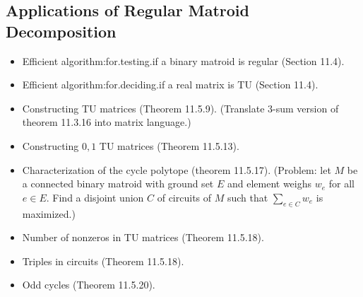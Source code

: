 \subsection{Applications of Regular Matroid Decomposition}

\begin{itemize}
  \item Efficient algorithm:for.testing.if a binary matroid is regular (Section 11.4).
  \item Efficient algorithm:for.deciding.if a real matrix is TU (Section 11.4).
  \item Constructing TU matrices (Theorem 11.5.9). (Translate $3$-sum version of theorem 11.3.16 into matrix language.)
  \item Constructing ${0, 1}$ TU matrices (Theorem 11.5.13).
  \item Characterization of the cycle polytope (theorem 11.5.17). (Problem: let $M$ be a connected binary matroid with ground set $E$ and element weighs $w_{e}$ for all $e \in E$. Find a disjoint union $C$ of circuits of $M$ such that $\sum_{e \in C} w_{e}$ is maximized.)
  \item Number of nonzeros in TU matrices (Theorem 11.5.18).
  \item Triples in circuits (Theorem 11.5.18).
  \item Odd cycles (Theorem 11.5.20).
\end{itemize}
